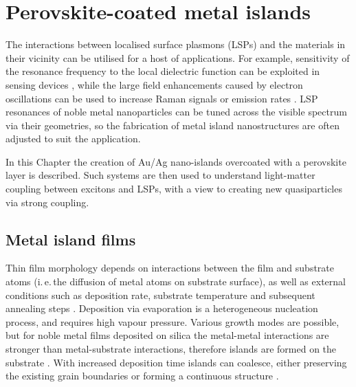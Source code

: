
\chapter{Perovskite-coated metal islands}

\graphicspath{{Chapter6/Figures/}}

The interactions between localised surface plasmons (LSPs) and the materials in their vicinity can be utilised for a host of applications. For example, sensitivity of the resonance frequency to the local dielectric function can be exploited in sensing devices \cite{Jensen2000, Xu2004, Malinsky2001, Royer1987}, while the large field enhancements caused by electron oscillations can be used to increase Raman signals \cite{Cade2009, Olson2001, Talley2005} or emission rates \cite{Toftegaard2011, Cho2010, Reboud2013, Blanco2004}. LSP resonances of noble metal nanoparticles can be tuned across the visible spectrum via their geometries, so the fabrication of metal island nanostructures are often adjusted to suit the application.

In this Chapter the creation of Au/Ag nano-islands overcoated with a perovskite layer is described. Such systems are then used to understand light-matter coupling between excitons and LSPs, with a view to creating new quasiparticles via strong coupling.

\section{Metal island films}
Thin film morphology depends on interactions between the film and substrate atoms (i.\,e.\,the diffusion of metal atoms on substrate surface), as well as external conditions such as deposition rate, substrate temperature and subsequent annealing steps \cite{Kaiser2002}. Deposition via evaporation is a heterogeneous nucleation process, and requires high vapour pressure. Various growth modes are possible, but for noble metal films deposited on silica the metal-metal interactions are stronger than metal-substrate interactions, therefore islands are formed on the substrate \cite{Kaiser2002}. With increased deposition time islands can coalesce, either preserving the existing grain boundaries or forming a continuous structure \cite{Sennett1950,Gupta2002}.

